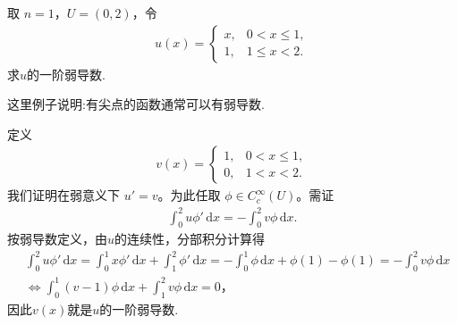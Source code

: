 \documentclass[../../main.tex]{subfiles}
\begin{document}
\begin{example}\label{example:ch05-弱导例1}
取 $n=1$，$U=(0,2)$，令
\begin{align*}
u(x)=
\begin{cases}
x, & 0<x\leqslant 1,\\
1, & 1\leqslant x<2.
\end{cases}
\end{align*}
求$u$的一阶弱导数.
\end{example}
\begin{remark}
这里例子说明:有尖点的函数通常可以有弱导数.
\end{remark}
\begin{solution}
定义
\begin{align*}
v(x)=
\begin{cases}
1, & 0<x\leqslant 1,\\
0, & 1<x<2.
\end{cases}
\end{align*}
我们证明在弱意义下 $u'=v$。为此任取 $\phi\in C^{\infty}_{c}(U)$。需证
\begin{align*}
\int_{0}^{2}u\phi'\,\mathrm{d}x=-\int_{0}^{2}v\phi\,\mathrm{d}x.
\end{align*}
按弱导数定义，由$u$的连续性，分部积分计算得
\begin{align*}
&\int_{0}^{2}u\phi'\,\mathrm{d}x
=\int_{0}^{1}x\phi'\,\mathrm{d}x+\int_{1}^{2}\phi'\,\mathrm{d}x
=-\int_{0}^{1}\phi\,\mathrm{d}x+\phi(1)-\phi(1)
=-\int_{0}^{2}v\phi\,\mathrm{d}x
\\
&\Longleftrightarrow \int_0^1{\left( v-1 \right) \phi \,\mathrm{d}x}+\int_1^2{v\phi \,\mathrm{d}x}=0，
\end{align*}
因此$v(x)$就是$u$的一阶弱导数.
\end{solution}
\end{document}
